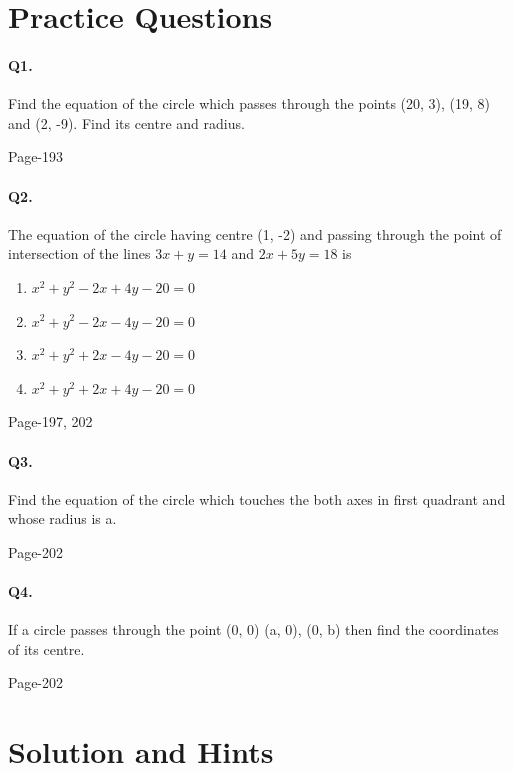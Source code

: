 \documentclass{article}
\begin{document}
\section*{Practice Questions}
\paragraph{Q1.}Find the equation of the circle which passes through the points (20, 3),
(19, 8) and (2, -9). Find its centre and radius.
\begin{flushright}
Page-193
\end{flushright}

\paragraph{Q2.}The equation of the circle having centre (1, -2) and passing through the
point of intersection of the lines $3x + y = 14$ and $2x + 5y = 18$ is\
\begin{enumerate}
    \item $x^2 + y^2 - 2x + 4y - 20 = 0$
    \item $x^2 + y^2 - 2x - 4y - 20 = 0$
    \item $x^2 + y^2 + 2x - 4y - 20 = 0$
    \item $x^2 + y^2 + 2x + 4y - 20 = 0$
\end{enumerate}
\begin{flushright}
    Page-197, 202
\end{flushright}

\paragraph{Q3.}Find the equation of the circle which touches the both axes in first quadrant and
whose radius is a.
\begin{flushright}
    Page-202
\end{flushright}

\paragraph{Q4.}If a circle passes through the point (0, 0) (a, 0), (0, b) then find the coordinates of
its centre.
\begin{flushright}
    Page-202
\end{flushright}
\clearpage


\section*{Solution and Hints}
\end{document}

